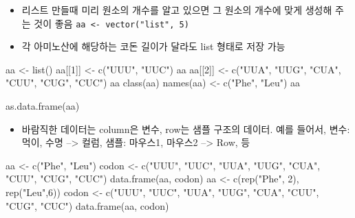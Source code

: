 \documentclass[
]{book}
\newenvironment{Shaded}{\begin{snugshade}}{\end{snugshade}}
\newcommand{\DecValTok}[1]{\textcolor[rgb]{0.00,0.00,0.81}{#1}}
\newcommand{\FunctionTok}[1]{\textcolor[rgb]{0.00,0.00,0.00}{#1}}
\newcommand{\NormalTok}[1]{#1}
\newcommand{\OtherTok}[1]{\textcolor[rgb]{0.56,0.35,0.01}{#1}}
\newcommand{\StringTok}[1]{\textcolor[rgb]{0.31,0.60,0.02}{#1}}
\providecommand{\tightlist}{%
  \setlength{\itemsep}{0pt}\setlength{\parskip}{0pt}}
\begin{document}
\begin{itemize}
\tightlist
\item
  리스트 만들때 미리 원소의 개수를 알고 있으면 그 원소의 개수에 맞게 생성해 주는 것이 좋음 \texttt{aa\ \textless{}-\ vector("list",\ 5)}
\item
  각 아미노산에 해당하는 코돈 길이가 달라도 list 형태로 저장 가능
\end{itemize}

\begin{Shaded}
\begin{Highlighting}[]
\NormalTok{aa }\OtherTok{\textless{}{-}} \FunctionTok{list}\NormalTok{()}
\NormalTok{aa[[}\DecValTok{1}\NormalTok{]] }\OtherTok{\textless{}{-}} \FunctionTok{c}\NormalTok{(}\StringTok{"UUU"}\NormalTok{, }\StringTok{"UUC"}\NormalTok{)}
\NormalTok{aa}
\NormalTok{aa[[}\DecValTok{2}\NormalTok{]] }\OtherTok{\textless{}{-}} \FunctionTok{c}\NormalTok{(}\StringTok{"UUA"}\NormalTok{, }\StringTok{"UUG"}\NormalTok{, }\StringTok{"CUA"}\NormalTok{, }\StringTok{"CUU"}\NormalTok{, }\StringTok{"CUG"}\NormalTok{, }\StringTok{"CUC"}\NormalTok{)}
\NormalTok{aa}
\FunctionTok{class}\NormalTok{(aa)}
\FunctionTok{names}\NormalTok{(aa) }\OtherTok{\textless{}{-}} \FunctionTok{c}\NormalTok{(}\StringTok{"Phe"}\NormalTok{, }\StringTok{"Leu"}\NormalTok{)}
\NormalTok{aa}

\FunctionTok{as.data.frame}\NormalTok{(aa)}
\end{Highlighting}
\end{Shaded}

\begin{itemize}
\tightlist
\item
  바람직한 데이터는 column은 변수, row는 샘플 구조의 데이터. 예를 들어서, 변수:먹이, 수명 --\textgreater{} 컬럼, 샘플: 마우스1, 마우스2 --\textgreater{} Row, 등
\end{itemize}

\begin{Shaded}
\begin{Highlighting}[]
\NormalTok{aa }\OtherTok{\textless{}{-}} \FunctionTok{c}\NormalTok{(}\StringTok{"Phe"}\NormalTok{, }\StringTok{"Leu"}\NormalTok{)}
\NormalTok{codon }\OtherTok{\textless{}{-}} \FunctionTok{c}\NormalTok{(}\StringTok{"UUU"}\NormalTok{, }\StringTok{"UUC"}\NormalTok{, }\StringTok{"UUA"}\NormalTok{, }\StringTok{"UUG"}\NormalTok{, }\StringTok{"CUA"}\NormalTok{, }\StringTok{"CUU"}\NormalTok{, }\StringTok{"CUG"}\NormalTok{, }\StringTok{"CUC"}\NormalTok{)}
\FunctionTok{data.frame}\NormalTok{(aa, codon)}
\NormalTok{aa }\OtherTok{\textless{}{-}} \FunctionTok{c}\NormalTok{(}\FunctionTok{rep}\NormalTok{(}\StringTok{"Phe"}\NormalTok{, }\DecValTok{2}\NormalTok{), }\FunctionTok{rep}\NormalTok{(}\StringTok{"Leu"}\NormalTok{,}\DecValTok{6}\NormalTok{))}
\NormalTok{codon }\OtherTok{\textless{}{-}} \FunctionTok{c}\NormalTok{(}\StringTok{"UUU"}\NormalTok{, }\StringTok{"UUC"}\NormalTok{, }\StringTok{"UUA"}\NormalTok{, }\StringTok{"UUG"}\NormalTok{, }\StringTok{"CUA"}\NormalTok{, }\StringTok{"CUU"}\NormalTok{, }\StringTok{"CUG"}\NormalTok{, }\StringTok{"CUC"}\NormalTok{)}
\FunctionTok{data.frame}\NormalTok{(aa, codon)}
\end{Highlighting}
\end{Shaded}
\end{document}
